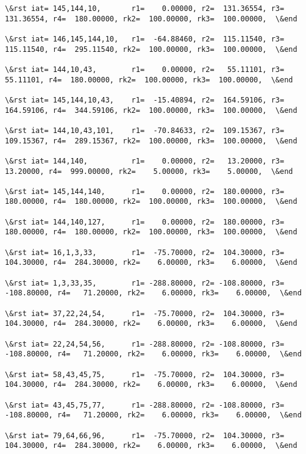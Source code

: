 \documentclass[11pt]{article}
\begin{document}
\begin{Verbatim}[commandchars=\\\{\}]
\&rst iat= 145,144,10,       r1=    0.00000, r2=  131.36554, r3=  131.36554, r4=  180.00000, rk2=  100.00000, rk3=  100.00000,  \&end

\&rst iat= 146,145,144,10,   r1=  -64.88460, r2=  115.11540, r3=  115.11540, r4=  295.11540, rk2=  100.00000, rk3=  100.00000,  \&end

\&rst iat= 144,10,43,        r1=    0.00000, r2=   55.11101, r3=   55.11101, r4=  180.00000, rk2=  100.00000, rk3=  100.00000,  \&end

\&rst iat= 145,144,10,43,    r1=  -15.40894, r2=  164.59106, r3=  164.59106, r4=  344.59106, rk2=  100.00000, rk3=  100.00000,  \&end

\&rst iat= 144,10,43,101,    r1=  -70.84633, r2=  109.15367, r3=  109.15367, r4=  289.15367, rk2=  100.00000, rk3=  100.00000,  \&end

\&rst iat= 144,140,          r1=    0.00000, r2=   13.20000, r3=   13.20000, r4=  999.00000, rk2=    5.00000, rk3=    5.00000,  \&end

\&rst iat= 145,144,140,      r1=    0.00000, r2=  180.00000, r3=  180.00000, r4=  180.00000, rk2=  100.00000, rk3=  100.00000,  \&end

\&rst iat= 144,140,127,      r1=    0.00000, r2=  180.00000, r3=  180.00000, r4=  180.00000, rk2=  100.00000, rk3=  100.00000,  \&end

\&rst iat= 16,1,3,33,        r1=  -75.70000, r2=  104.30000, r3=  104.30000, r4=  284.30000, rk2=    6.00000, rk3=    6.00000,  \&end

\&rst iat= 1,3,33,35,        r1= -288.80000, r2= -108.80000, r3= -108.80000, r4=   71.20000, rk2=    6.00000, rk3=    6.00000,  \&end

\&rst iat= 37,22,24,54,      r1=  -75.70000, r2=  104.30000, r3=  104.30000, r4=  284.30000, rk2=    6.00000, rk3=    6.00000,  \&end

\&rst iat= 22,24,54,56,      r1= -288.80000, r2= -108.80000, r3= -108.80000, r4=   71.20000, rk2=    6.00000, rk3=    6.00000,  \&end

\&rst iat= 58,43,45,75,      r1=  -75.70000, r2=  104.30000, r3=  104.30000, r4=  284.30000, rk2=    6.00000, rk3=    6.00000,  \&end

\&rst iat= 43,45,75,77,      r1= -288.80000, r2= -108.80000, r3= -108.80000, r4=   71.20000, rk2=    6.00000, rk3=    6.00000,  \&end

\&rst iat= 79,64,66,96,      r1=  -75.70000, r2=  104.30000, r3=  104.30000, r4=  284.30000, rk2=    6.00000, rk3=    6.00000,  \&end


\end{Verbatim}
\end{document}
